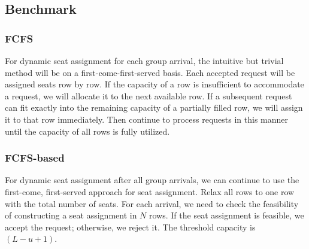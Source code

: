 

\subsection{Benchmark}
 

\subsubsection{FCFS}\label{largest_pattern}
For dynamic seat assignment for each group arrival, the intuitive but trivial method will be on a first-come-first-served basis. Each accepted request will be assigned seats row by row. If the capacity of a row is insufficient to accommodate a request, we will allocate it to the next available row. If a subsequent request can fit exactly into the remaining capacity of a partially filled row, we will assign it to that row immediately. Then continue to process requests in this manner until the capacity of all rows is fully utilized.



\subsubsection{FCFS-based}\label{FCFS-based}
For dynamic seat assignment after all group arrivals, we can continue to use the first-come, first-served approach for seat assignment. Relax all rows to one row with the total number of seats. For each arrival, we need to check the feasibility of constructing a seat assignment in $N$ rows. If the seat assignment is feasible, we accept the request; otherwise, we reject it. The threshold capacity is $(L -u +1)$.







